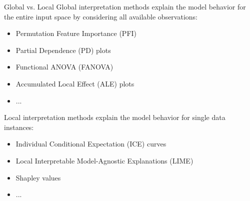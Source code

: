 \documentclass[11pt,compress,t,notes=noshow, aspectratio=169, xcolor=table]{beamer}
\newcommand\tab[1][1cm]{\hspace*{#1}}
\begin{document}
\begin{frame}{Global vs. Local}
Global interpretation methods explain the model behavior for the entire input space by considering all available observations:
	\begin{itemize}
		\item Permutation Feature Importance (PFI)
		\item Partial Dependence (PD) plots
		\item Functional ANOVA (FANOVA)
		\item Accumulated Local Effect (ALE) plots
		\item ...
	\end{itemize}
\bigskip
Local interpretation methods explain the model behavior for single data instances:
	\begin{itemize}
		\item Individual Conditional Expectation (ICE) curves
		\item Local Interpretable Model-Agnostic Explanations (LIME)
		\item Shapley values
		\item ...
	\end{itemize}
\end{frame}


\end{document}
